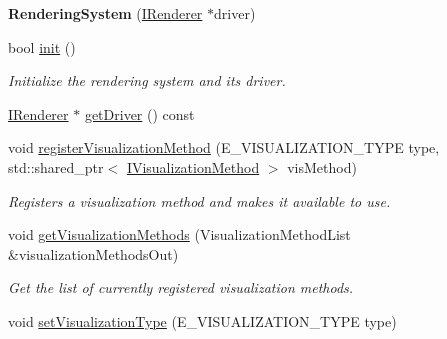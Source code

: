 \begin{DoxyCompactItemize}
\item 
{\bfseries Rendering\+System} (\hyperlink{class_lots_of_lines_1_1_i_renderer}{I\+Renderer} $\ast$driver)\hypertarget{class_lots_of_lines_1_1_rendering_system_a5b5b463ecfc4dd054a7e4f7e02567678}{}\label{class_lots_of_lines_1_1_rendering_system_a5b5b463ecfc4dd054a7e4f7e02567678}

\item 
bool \hyperlink{class_lots_of_lines_1_1_rendering_system_a60f98835a62cc7f99d64b796c0b03f34}{init} ()\hypertarget{class_lots_of_lines_1_1_rendering_system_a60f98835a62cc7f99d64b796c0b03f34}{}\label{class_lots_of_lines_1_1_rendering_system_a60f98835a62cc7f99d64b796c0b03f34}

\begin{DoxyCompactList}\small\item\em Initialize the rendering system and its driver. \end{DoxyCompactList}\item 
\hyperlink{class_lots_of_lines_1_1_i_renderer}{I\+Renderer} $\ast$ \hyperlink{class_lots_of_lines_1_1_rendering_system_a16779b7f56c69d2f7f0c9723f861e21a}{get\+Driver} () const 
\item 
void \hyperlink{class_lots_of_lines_1_1_rendering_system_aad7cff17a9e4dbe1151fb550c8595382}{register\+Visualization\+Method} (E\+\_\+\+V\+I\+S\+U\+A\+L\+I\+Z\+A\+T\+I\+O\+N\+\_\+\+T\+Y\+PE type, std\+::shared\+\_\+ptr$<$ \hyperlink{class_lots_of_lines_1_1_i_visualization_method}{I\+Visualization\+Method} $>$ vis\+Method)\hypertarget{class_lots_of_lines_1_1_rendering_system_aad7cff17a9e4dbe1151fb550c8595382}{}\label{class_lots_of_lines_1_1_rendering_system_aad7cff17a9e4dbe1151fb550c8595382}

\begin{DoxyCompactList}\small\item\em Registers a visualization method and makes it available to use. \end{DoxyCompactList}\item 
void \hyperlink{class_lots_of_lines_1_1_rendering_system_a0d8e3c4c4c62f29ea004940fcff254f5}{get\+Visualization\+Methods} (Visualization\+Method\+List \&visualization\+Methods\+Out)\hypertarget{class_lots_of_lines_1_1_rendering_system_a0d8e3c4c4c62f29ea004940fcff254f5}{}\label{class_lots_of_lines_1_1_rendering_system_a0d8e3c4c4c62f29ea004940fcff254f5}

\begin{DoxyCompactList}\small\item\em Get the list of currently registered visualization methods. \end{DoxyCompactList}\item 
void \hyperlink{class_lots_of_lines_1_1_rendering_system_af61a1fd1070b7b1a922a4c6a97e43840}{set\+Visualization\+Type} (E\+\_\+\+V\+I\+S\+U\+A\+L\+I\+Z\+A\+T\+I\+O\+N\+\_\+\+T\+Y\+PE type)\hypertarget{class_lots_of_lines_1_1_rendering_system_af61a1fd1070b7b1a922a4c6a97e43840}{}\label{class_lots_of_lines_1_1_rendering_system_af61a1fd1070b7b1a922a4c6a97e43840}


\end{DoxyCompactItemize}

